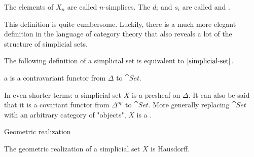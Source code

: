\documentclass[../../main.tex]{subfiles}
\begin{document}
    The elements of $X_n$ are called $n$-simplices. The $d_i$ and $s_i$ are called  and .
    
    This definition is quite cumbersome. Luckily, there is a much more elegant definition in the language of category theory that also reveals a lot of the structure of simplicial sets.

    The following definition of a simplicial set is equivalent to $\ref{simplicial-set}$.

    \begin{definition}
        a  is a contravariant functor from $\Delta$ to $\cat{Set}$.
    \end{definition}

    In even shorter terms: a simplicial set $X$ is a presheaf on $\Delta$. It can also be said that it is a covariant functor from $\Delta^{op}$ to $\cat{Set}$. More generally replacing $\cat{Set}$ with an arbitrary category of "objects", $X$ is a .
    
    Geometric realization

    \begin{proposition}
        The geometric realization of a simplicial set $X$ is Hausdorff.
    \end{proposition}
\end{document}
